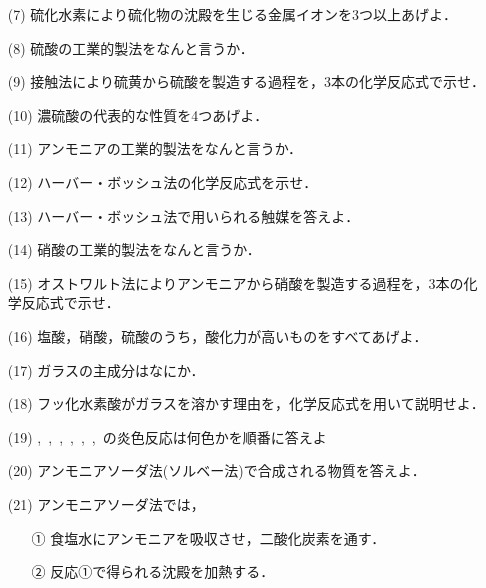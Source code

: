\documentclass[a4paper,twocolumn,11pt]{ltjsarticle}
\begin{document}
        \begin{itemize}
    \item [(7)]硫化水素により硫化物の沈殿を生じる金属イオンを3つ以上あげよ．\\[2cm]
            \item [(8)]硫酸の工業的製法をなんと言うか．\\[2cm]
    \item [(9)]接触法により硫黄から硫酸を製造する過程を，3本の化学反応式で示せ．\\[4cm]
    \item [(10)]濃硫酸の代表的な性質を4つあげよ．\\[3cm]
    \item[(11)]アンモニアの工業的製法をなんと言うか．\\[2cm]
    \newpage
    \item[(12)]ハーバー・ボッシュ法の化学反応式を示せ．\\[2cm]
    \item[(13)]ハーバー・ボッシュ法で用いられる触媒を答えよ．\\[2cm]
    \item[(14)]硝酸の工業的製法をなんと言うか．\\[2cm]
    \item[(15)]オストワルト法によりアンモニアから硝酸を製造する過程を，3本の化学反応式で示せ．\\ [4cm]
    \item[(16)]塩酸，硝酸，硫酸のうち，酸化力が高いものをすべてあげよ．\\[2cm]
    \item[(17)]ガラスの主成分はなにか．
    \newpage
    \item[(18)]フッ化水素酸がガラスを溶かす理由を，化学反応式を用いて説明せよ．\\[2cm]
    \item[(19)],~,~,~,~,~,~の炎色反応は何色かを順番に答えよ\\[2cm]
    \item[(20)]アンモニアソーダ法(ソルベー法)で合成される物質を答えよ．\\[2cm]
    \item[(21)]アンモニアソーダ法では，\begin{itemize}
        \item [①]食塩水にアンモニアを吸収させ，二酸化炭素を通す．
        \item[②]反応①で得られる沈殿を加熱する．
    \end{itemize}

\end{itemize}
\end{document}
